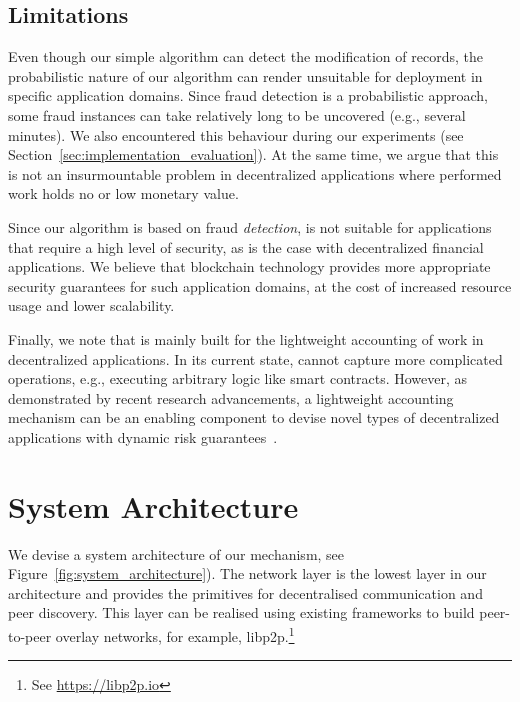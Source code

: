 \subsection{Limitations}
Even though our simple algorithm can detect the modification of records, the probabilistic nature of our algorithm can render \TrustChain{} unsuitable for deployment in specific application domains.
Since fraud detection is a probabilistic approach, some fraud instances can take relatively long to be uncovered (e.g., several minutes).
We also encountered this behaviour during our experiments (see Section~\ref{sec:implementation_evaluation}).
At the same time, we argue that this is not an insurmountable problem in decentralized applications where performed work holds no or low monetary value.

Since our algorithm is based on fraud \emph{detection}, \TrustChain{} is not suitable for applications that require a high level of security, as is the case with decentralized financial applications.
We believe that blockchain technology provides more appropriate security guarantees for such application domains, at the cost of increased resource usage and lower scalability.

Finally, we note that \TrustChain{} is mainly built for the lightweight accounting of work in decentralized applications.
In its current state, \TrustChain{} cannot capture more complicated operations, e.g., executing arbitrary logic like smart contracts.
However, as demonstrated by recent research advancements, a lightweight accounting mechanism can be an enabling component to devise novel types of decentralized applications with dynamic risk guarantees~\cite{de2021xchange,de2019devid,de2018real}.


\section{System Architecture}
\label{sec:system_architecture}
We devise a system architecture of our \TrustChain{} mechanism, see Figure~\ref{fig:system_architecture}).
The network layer is the lowest layer in our architecture and provides the primitives for decentralised communication and peer discovery.
This layer can be realised using existing frameworks to build peer-to-peer overlay networks, for example, libp2p.\footnote{See \url{https://libp2p.io}}

